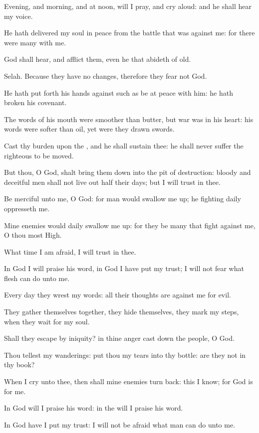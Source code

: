 \Verse Evening, and morning, and at noon, will I pray, and cry aloud: and he shall hear my voice.

\Verse He hath delivered my soul in peace from the battle that was against me: for there were many with me.

\Verse God shall hear, and afflict them, even he that abideth of old.

Selah. Because they have no changes, therefore they fear not God.

\Verse He hath put forth his hands against such as be at peace with him: he hath broken his covenant.

\Verse The words of his mouth were smoother than butter, but war was in his heart: his words were softer than oil, yet were they drawn swords.

\Verse Cast thy burden upon the \LORD, and he shall sustain thee: he shall never suffer the righteous to be moved.

\Verse But thou, O God, shalt bring them down into the pit of destruction: bloody and deceitful men shall not live out half their days; but I will trust in thee.




\Chapter
\Verse Be merciful unto me, O God: for man would swallow me up; he fighting daily oppresseth me.

\Verse Mine enemies would daily swallow me up: for they be many that fight against me, O thou most High.

\Verse What time I am afraid, I will trust in thee.

\Verse In God I will praise his word, in God I have put my trust; I will not fear what flesh can do unto me.

\Verse Every day they wrest my words: all their thoughts are against me for evil.

\Verse They gather themselves together, they hide themselves, they mark my steps, when they wait for my soul.

\Verse Shall they escape by iniquity? in thine anger cast down the people, O God.

\Verse Thou tellest my wanderings: put thou my tears into thy bottle: are they not in thy book?

\Verse When I cry unto thee, then shall mine enemies turn back: this I know; for God is for me.

\Verse In God will I praise his word: in the \LORD will I praise his word.

\Verse In God have I put my trust: I will not be afraid what man can do unto me.

